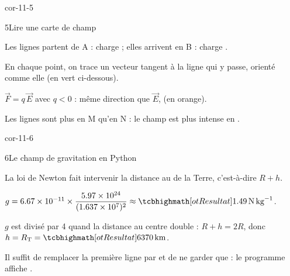\begin{blocLivre}{cor-11-5}
\begin{corrige}{5}{Lire une carte de champ}
\begin{questions}
\item Les lignes partent de A : charge  ; elles arrivent en B : charge .
\item En chaque point, on trace un vecteur tangent à la ligne qui y passe, orienté comme elle (en vert ci-dessous).
\item $\vec{F}=q\,\vec{E}$ avec $q<0$ : même direction que $\vec{E}$,  (en orange).
\item Les lignes sont plus  en M qu'en N : le champ est plus intense en .
\end{questions}
\end{corrige}
\end{blocLivre}
\begin{blocLivre}{cor-11-6}
\begin{corrige}{6}{Le champ de gravitation en Python}
\begin{questions}
\item La loi de Newton fait intervenir la distance au  de la Terre, c'est-à-dire $R+h$.
\item $g=\num{6,67e-11}\times\dfrac{\num{5,97e24}}{(\num{1,637e7})^2}\approx\res{\qty{1,49}{N.kg^{-1}}}$.
\item $g$ est divisé par 4 quand la distance au centre double : $R+h=2R$, donc $h=R_\mathrm{T}=\res{\qty{6370}{km}}$.
\item Il suffit de remplacer la première ligne par  et de ne garder que  :
le programme affiche .
\end{questions}
\end{corrige}
\end{blocLivre}
